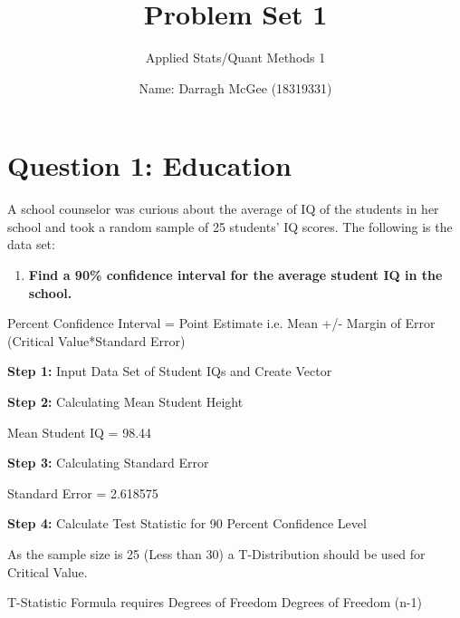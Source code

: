 \documentclass[12pt,letterpaper]{article}
\title{Problem Set 1}
\date{
	Name: Darragh McGee (18319331)\\
}
\author{Applied Stats/Quant Methods 1}
\begin{document}
	\maketitle

	\section*{Question 1: Education}

A school counselor was curious about the average of IQ of the students in her school and took a random sample of 25 students' IQ scores. The following is the data set:\\
\vspace{.5cm}
  
\vspace{.5cm}

\begin{enumerate}
\item \textbf{Find a 90\% confidence interval for the average student IQ in the school.}
\end{enumerate}

 Percent Confidence Interval = Point Estimate i.e. Mean +/- Margin of Error (Critical Value*Standard Error)

\vspace{.5cm}
\noindent\textbf{Step 1:} Input Data Set of Student IQs and Create Vector
 

\vspace{.5cm}
\noindent\textbf{Step 2:} Calculating Mean Student Height
 
Mean Student IQ =  98.44

\vspace{.5cm}
\noindent\textbf{Step 3:} Calculating Standard Error
 
Standard Error = 2.618575

\vspace{.5cm}
\noindent\textbf{Step 4:} Calculate Test Statistic for 90 Percent Confidence Level

\noindent As the sample size is 25 (Less than 30) a T-Distribution should be used for Critical Value.  

\vspace{.5cm}
\noindent T-Statistic Formula requires Degrees of Freedom Degrees of Freedom (n-1)
 
\end{document}
